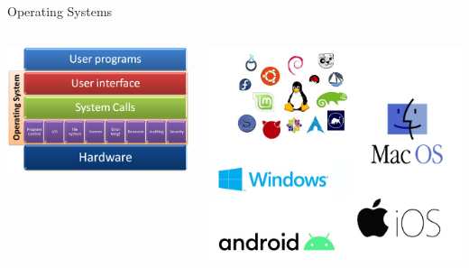 \documentclass[aspectratio=169]{beamer}
\begin{document}
\begin{frame}{Operating Systems}

    \begin{columns}
        \begin{column}{0.5\textwidth}
            \includegraphics[width=\textwidth]{imgs/vis_1.jpg}
        \end{column}
        \begin{column}{0.5\textwidth}
            \includegraphics[width=\textwidth]{imgs/vis_2.jpg}
        \end{column}
    \end{columns}

\end{frame}
\end{document}
